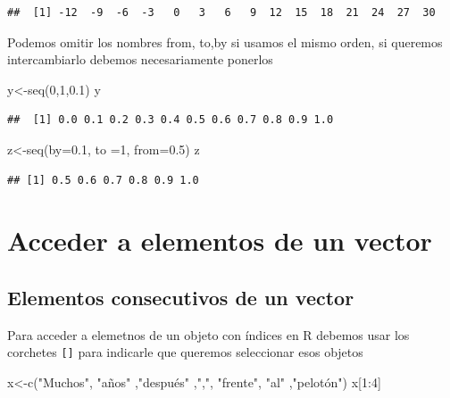 \documentclass[
]{book}
\newenvironment{Shaded}{\begin{snugshade}}{\end{snugshade}}
\newcommand{\AttributeTok}[1]{\textcolor[rgb]{0.77,0.63,0.00}{#1}}
\newcommand{\DecValTok}[1]{\textcolor[rgb]{0.00,0.00,0.81}{#1}}
\newcommand{\FloatTok}[1]{\textcolor[rgb]{0.00,0.00,0.81}{#1}}
\newcommand{\FunctionTok}[1]{\textcolor[rgb]{0.00,0.00,0.00}{#1}}
\newcommand{\NormalTok}[1]{#1}
\newcommand{\OtherTok}[1]{\textcolor[rgb]{0.56,0.35,0.01}{#1}}
\newcommand{\SpecialCharTok}[1]{\textcolor[rgb]{0.00,0.00,0.00}{#1}}
\newcommand{\StringTok}[1]{\textcolor[rgb]{0.31,0.60,0.02}{#1}}
\begin{document}
\begin{verbatim}
##  [1] -12  -9  -6  -3   0   3   6   9  12  15  18  21  24  27  30
\end{verbatim}

Podemos omitir los nombres from, to,by si usamos el mismo orden, si queremos intercambiarlo debemos necesariamente ponerlos

\begin{Shaded}
\begin{Highlighting}[]
\NormalTok{y}\OtherTok{\textless{}{-}}\FunctionTok{seq}\NormalTok{(}\DecValTok{0}\NormalTok{,}\DecValTok{1}\NormalTok{,}\FloatTok{0.1}\NormalTok{)}
\NormalTok{y}
\end{Highlighting}
\end{Shaded}

\begin{verbatim}
##  [1] 0.0 0.1 0.2 0.3 0.4 0.5 0.6 0.7 0.8 0.9 1.0
\end{verbatim}

\begin{Shaded}
\begin{Highlighting}[]
\NormalTok{z}\OtherTok{\textless{}{-}}\FunctionTok{seq}\NormalTok{(}\AttributeTok{by=}\FloatTok{0.1}\NormalTok{, }\AttributeTok{to =}\DecValTok{1}\NormalTok{, }\AttributeTok{from=}\FloatTok{0.5}\NormalTok{)}
\NormalTok{z}
\end{Highlighting}
\end{Shaded}

\begin{verbatim}
## [1] 0.5 0.6 0.7 0.8 0.9 1.0
\end{verbatim}

\hypertarget{acceder-a-elementos-de-un-vector}{%
\section{Acceder a elementos de un vector}\label{acceder-a-elementos-de-un-vector}}

\hypertarget{elementos-consecutivos-de-un-vector}{%
\subsection{Elementos consecutivos de un vector}\label{elementos-consecutivos-de-un-vector}}

Para acceder a elemetnos de un objeto con índices en R debemos usar los
corchetes \texttt{{[}{]}} para indicarle que queremos seleccionar esos objetos

\begin{Shaded}
\begin{Highlighting}[]
\NormalTok{x}\OtherTok{\textless{}{-}}\FunctionTok{c}\NormalTok{(}\StringTok{"Muchos"}\NormalTok{, }\StringTok{"años"}\NormalTok{ ,}\StringTok{"después"}\NormalTok{ ,}\StringTok{","}\NormalTok{, }\StringTok{"frente"}\NormalTok{, }\StringTok{"al"}\NormalTok{ ,}\StringTok{"pelotón"}\NormalTok{)}
\NormalTok{x[}\DecValTok{1}\SpecialCharTok{:}\DecValTok{4}\NormalTok{]}
\end{Highlighting}
\end{Shaded}
\end{document}
